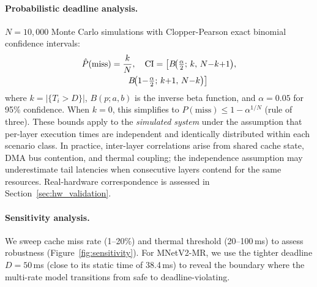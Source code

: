 \documentclass[journal]{IEEEtran}
\begin{document}
\paragraph{Probabilistic deadline analysis.}
$N = 10{,}000$ Monte Carlo simulations with Clopper-Pearson exact binomial confidence intervals:
\begin{align}
\hat{P}(\mathrm{miss}) &= \frac{k}{N}, \quad \mathrm{CI} = \bigl[ B\!\bigl(\tfrac{\alpha}{2};\, k,\, N{-}k{+}1\bigr),\notag\\
&\qquad B\!\bigl(1{-}\tfrac{\alpha}{2};\, k{+}1,\, N{-}k\bigr) \bigr]
\label{eq:pmiss}
\end{align}
where $k = |\{T_i > D\}|$, $B(p; a, b)$ is the inverse beta function, and $\alpha = 0.05$ for 95\% confidence. When $k = 0$, this simplifies to $P(\mathrm{miss}) \leq 1 - \alpha^{1/N}$ (rule of three).
These bounds apply to the \emph{simulated system} under the assumption that per-layer execution times are independent and identically distributed within each scenario class. In practice, inter-layer correlations arise from shared cache state, DMA bus contention, and thermal coupling; the independence assumption may underestimate tail latencies when consecutive layers contend for the same resources. Real-hardware correspondence is assessed in Section~\ref{sec:hw_validation}.

\paragraph{Sensitivity analysis.}
We sweep cache miss rate (1--20\%) and thermal threshold (20--100\,ms) to assess robustness (Figure~\ref{fig:sensitivity}).
For MNetV2-MR, we use the tighter deadline $D = 50$\,ms (close to its static time of 38.4\,ms) to reveal the boundary where the multi-rate model transitions from safe to deadline-violating.
\end{document}

